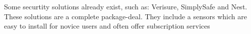 Some securtity solutions already exist, such as: Verisure, SimplySafe and Nest.
These solutions are a complete package-deal. They include a sensors which are easy to install for novice users and often offer subscription services 